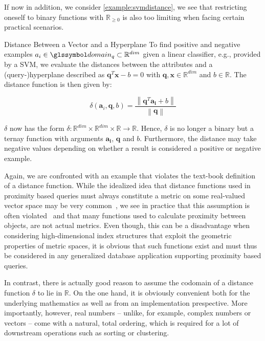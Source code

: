 If now in addition, we consider \cref{example:svmdistance}, we see that restricting oneself to binary functions with $\mathbb{R}_{\geq 0}$ is also too limiting when facing certain practical scenarios.

\begin{example}[label=example:svmdistance]{Distance Between a Vector and a Hyperplane}{}
    To find positive and negative examples $a_{i} \in \domain_q \subset \mathbb{R}^{dim}$ given a linear classifier, e.g., provided by a SVM, we evaluate the distances between the attributes and a (query-)hyperplane described as $\mathbf{q}^T\mathbf{x} - b = 0$ with $\mathbf{q},\mathbf{x} \in \mathbb{R}^{dim}$ and $b \in \mathbb{R}$. The distance function is then given by:

    \begin{equation}
        \delta (\mathbf{a}_i, \mathbf{q}, b) = \frac{\left\|\mathbf{q}^T \mathbf{a_i} + b \right\|}{\left\|\mathbf{q}\right\|}
    \end{equation}
    
    $\delta$ now has the form $\delta \colon \mathbb{R}^{dim} \times \mathbb{R}^{dim} \times \mathbb{R} \to \mathbb{R}$. Hence, $\delta$ is no longer a binary but a ternay function with arguments $\mathbf{a_{i}}$, $\mathbf{q}$ and $b$. Furthermore, the distance may take negative values depending on whether a result is considered a positive or negative example.
\end{example}


Again, we are confronted with an example that violates the text-book definition of a distance function. While the idealized idea that distance functions used in proximity based queries must always constitute a metric on some real-valued vector space may be very common~\cite{Zezula:2006similarity}, we see in practice that this assumption is often violated~\cite{Bernhauer:2019Nonmetric}  and that many functions used to calculate proximity between objects, are not actual metrics. Even though, this can be a disadvantage when considering high-dimensional index structures that exploit the geometric properties of metric spaces, it is obvious that such functions exist and must thus be considered in any generalized database application supporting proximity based queries. 

In contrast, there is actually good reason to assume the codomain of a distance function  $\delta$ to lie in $\mathbb{R}$. On the one hand, it is obviously convenient both for the underlying mathematics as well as from an implementation prespective. More importantly, however, real numbers -- unlike, for example, complex numbers or vectors -- come with a natural, total ordering, which is required for a lot of downstream operations such as sorting or clustering.

